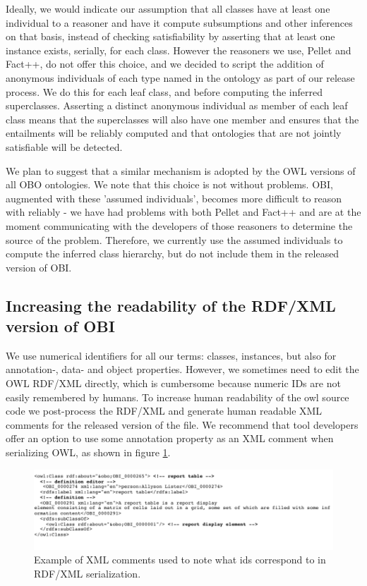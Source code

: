 \documentclass{elsart}       %
\begin{document}
Ideally, we would indicate our assumption that all classes have at least one individual to a reasoner and have it compute subsumptions and other inferences on that basis, instead of checking satisfiability by asserting that at least one instance exists, serially, for each class.
However the reasoners we use, Pellet\cite{pellet} and Fact++\cite{fact}, do not offer this choice, and we decided to script the addition of anonymous individuals of each type named in the ontology as part of our release process.
We do this for each leaf class, and before computing the inferred superclasses.
Asserting a distinct anonymous individual as member of each leaf class means that the superclasses will also have one member and ensures that the entailments will be reliably computed and that ontologies that are not jointly satisfiable will be detected.

We plan to suggest that a similar mechanism is adopted by the OWL versions of all OBO ontologies.
We note that this choice is not without problems.
OBI, augmented with these 'assumed individuals', becomes more difficult to reason with reliably - we have had problems with both Pellet and Fact++ and are at the moment communicating with the developers of those reasoners to determine the source of the problem.
Therefore, we currently use the assumed individuals to compute the inferred class hierarchy, but do not include them in the released version of OBI.

\subsection{Increasing the readability of the RDF/XML version of OBI}

We use numerical identifiers for all our terms: classes, instances, but also for annotation-, data- and object properties.
However, we sometimes need to edit the OWL RDF/XML directly, which is cumbersome because numeric IDs are not easily remembered by humans.
To increase human readability of the owl source code we post-process the RDF/XML and generate human readable XML comments for the released version of the file.
We recommend that tool developers offer an option to use some annotation property as an XML comment when serializing OWL, as shown in figure \ref{fig:comments}.  

\begin{figure}[t]
\centering \includegraphics*[width=1\columnwidth]{comments}
\caption{Example of XML comments used to note what ids correspond to in RDF/XML serialization.}
\label{fig:comments}
\end{figure}
\end{document}
